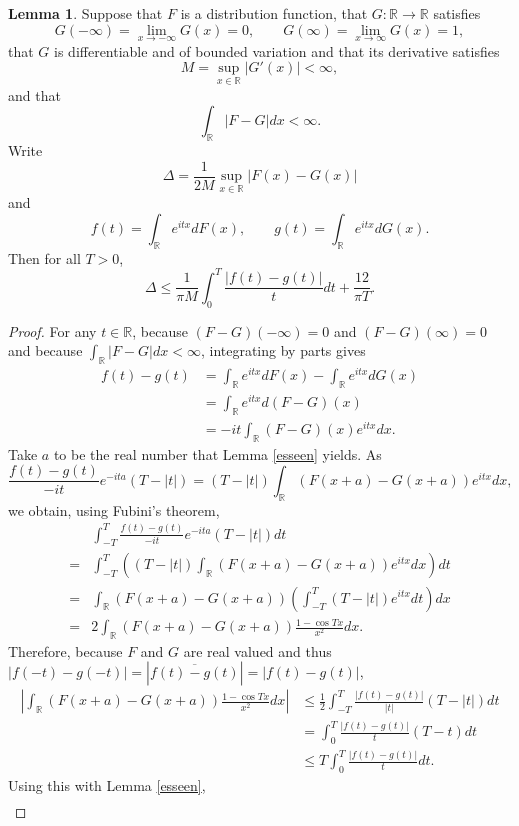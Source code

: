 \documentclass{article}
\theoremstyle{definition}
\newtheorem{lemma}[theorem]{Lemma}
\theoremstyle{definition}
\begin{document}
\begin{lemma}
Suppose that $F$ is a distribution function, that $G:\mathbb{R} \to \mathbb{R}$ satisfies
\[
G(-\infty)=\lim_{x \to -\infty} G(x) = 0, \qquad G(\infty) = \lim_{x \to \infty} G(x)=1,
\]
 that $G$ is differentiable and of bounded variation and that its derivative satisfies
\[
M=\sup_{x \in \mathbb{R}} |G'(x)| < \infty,
\]
and that
\[
\int_{\mathbb{R}} |F-G| dx < \infty.
\]
Write
\[
\Delta = \frac{1}{2M} \sup_{x \in \mathbb{R}} |F(x)-G(x)|
\]
and
\[
f(t) = \int_\mathbb{R} e^{itx} dF(x), \qquad g(t) = \int_\mathbb{R} e^{itx} dG(x).
\]
Then for all $T>0$,
\[
\Delta \leq \frac{1}{\pi M} \int_0^T \frac{|f(t)-g(t)|}{t} dt + \frac{12}{\pi T}.
\]
\label{characteristic}
\end{lemma}
\begin{proof}
For any $t \in \mathbb{R}$, because $(F-G)(-\infty)=0$ and $(F-G)(\infty)=0$ and because
$\int_\mathbb{R} |F-G| dx < \infty$, integrating by parts gives
\begin{align*}
f(t)-g(t)&= \int_\mathbb{R} e^{itx} dF(x)-\int_\mathbb{R} e^{itx} dG(x)\\
&=\int_{\mathbb{R}} e^{itx} d(F-G)(x)\\
&=-it \int_\mathbb{R} (F-G)(x) e^{itx} dx.
\end{align*}
Take $a$ to be the real number that Lemma \ref{esseen} yields. As 
\[
\frac{f(t)-g(t)}{-it} e^{-ita}(T-|t|) = (T-|t|) \int_\mathbb{R} (F(x+a)-G(x+a)) e^{itx} dx,
\]
we obtain, using Fubini's theorem,
\[
\begin{split}
&\int_{-T}^T \frac{f(t)-g(t)}{-it} e^{-ita}(T-|t|) dt\\
=&\int_{-T}^T \left((T-|t|) \int_\mathbb{R} (F(x+a)-G(x+a)) e^{itx} dx\right) dt\\
=&\int_\mathbb{R} (F(x+a)-G(x+a)) \left( \int_{-T}^T (T-|t|)e^{itx} dt \right) dx\\
=&2 \int_\mathbb{R} (F(x+a)-G(x+a)) \frac{1-\cos Tx}{x^2} dx.
\end{split}
\]
Therefore, because $F$ and $G$ are real valued and thus 
$|f(-t)-g(-t)|=|\overline{f(t)-g(t)}|=|f(t)-g(t)|$,
\begin{align*}
\left|\int_\mathbb{R} (F(x+a)-G(x+a)) \frac{1-\cos Tx}{x^2} dx\right|&\leq \frac{1}{2} \int_{-T}^T \frac{|f(t)-g(t)|}{|t|} (T-|t|)
dt\\
&=\int_0^T \frac{|f(t)-g(t)|}{t} (T-t) dt\\
&\leq T \int_0^T \frac{|f(t)-g(t)|}{t} dt.
\end{align*}
Using this with Lemma \ref{esseen},
\begin{align*}

\end{align*}
\end{proof}
\end{document}
